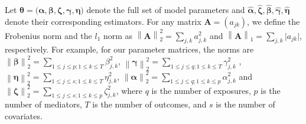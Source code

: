 \documentclass[
  12pt]{article}
\begin{document}


Let $\bm{\theta} = \big( \bm{\alpha}, \bm{\beta},  \bm{\zeta}, \bm{\gamma}, \bm{\eta} \big)$ denote the full set of model parameters and $\widehat{\bm{\alpha}},   \widehat{\bm{\zeta}},   \widehat{\bm{\beta}},   \widehat{\bm{\gamma}}, \widehat{\bm{\eta}}$ denote their corresponding estimators. For any matrix $\mathbf{A}= (a_{jk})$, we define the Frobenius norm and the $l_1$ norm as $\left\|  \mathbf{A}   \right\|_{2}^{2} = \displaystyle{ \sum_{j,k} }   a_{j,k}^{2}$ and $\left\|  \mathbf{A}   \right\|_{1} = \displaystyle{ \sum_{j,k} }   \vert a_{jk} \vert$, respectively.
For example, for our parameter matrices, the norms are $\left\|  \bm{\beta}   \right\|_{2}^{2} = \displaystyle{ \sum_{1 \leq j \leq  p ; 1 \leq k \leq  T } }   \beta_{j,k}^{2}  $,   \quad   $\left\|  \bm{\gamma}   \right\|_{2}^{2} = \displaystyle{ \sum_{1 \leq j \leq  q ; 1 \leq k \leq  T } }   \gamma_{j,k}^{2}  $ , \quad   $\left\|  \bm{\eta}   \right\|_{2}^{2} = \displaystyle{ \sum_{1 \leq j \leq  s ; 1 \leq k \leq  T } }   \eta_{j,k}^{2}$,
$\left\|  \bm{\alpha}   \right\|_{2}^{2} = \displaystyle{ \sum_{1 \leq j \leq  q ; 1 \leq k \leq  p } }   \alpha_{j,k}^{2}  $  \quad  and  \quad  $\left\|  \bm{\zeta}   \right\|_{2}^{2} = \displaystyle{ \sum_{1 \leq j \leq  s ; 1 \leq k \leq  p } }   \zeta_{j,k}^{2}$, where $q$ is the number of exposures, $p$ is the number of mediators, $T$ is the number of outcomes, and $s$ is the number of covariates.
\end{document}
